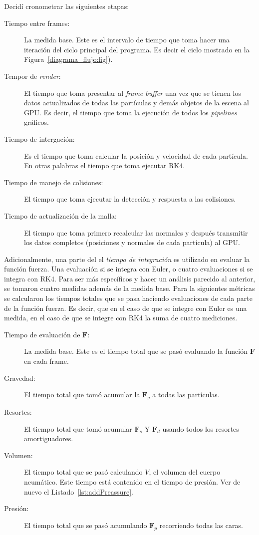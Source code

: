 Decidí cronometrar las siguientes etapas:
\begin{description}
 \item[Tiempo entre frames:] La medida base. Este es el intervalo  de tiempo que toma hacer una iteración del ciclo principal del programa. Es decir el ciclo mostrado en la Figura~\ref{diagrama_flujo:fig}).
 \item[Tempor de \emph{\textenglish{render}}:] El tiempo que toma presentar al \emph{\textenglish{frame buffer}} una vez que se tienen los datos actualizados de todas las partículas y demás objetos de la escena al GPU. Es decir, el tiempo que toma la ejecución de todos los \emph{\textenglish{pipelines}} gráficos.
 \item[Tiempo de intergación:] Es el tiempo que toma calcular la posición y velocidad de cada partícula. En otras palabras el tiempo que toma ejecutar RK4.
 \item[Tiempo de manejo de colisiones:] El tiempo que toma ejecutar la detección y respuesta a las colisiones.
 \item[Tiempo de actualización de la malla:] El tiempo que toma primero recalcular las normales y después transmitir los datos completos (posiciones y normales de cada partícula) al GPU.
\end{description}

Adicionalmente, una parte del el \emph{tiempo de integración} es utilizado en evaluar la función fuerza.
Una evaluación si se integra con Euler, o cuatro evaluaciones si se integra con RK4.
Para ser más específicos y hacer un análisis parecido al anterior, se tomaron cuatro medidas además de la medida base.
Para la siguientes métricas se calcularon los tiempos totales que se pasa haciendo evaluaciones de cada parte de la función fuerza.
Es decir, que en el caso de que se integre con Euler es una medida, en el caso de que se integre con RK4 la suma de cuatro mediciones.

\begin{description}
 \item[Tiempo de evaluación de $\textbf{F}$:] La medida base. Este es el tiempo total que se pasó evaluando la función $\textbf{F}$ en cada frame.
 \item[Gravedad:] El tiempo total que tomó acumular la $\textbf{F}_g$ a todas las partículas.
 \item[Resortes:] El tiempo total que tomó acumular $\textbf{F}_s$ Y $\textbf{F}_d$ usando todos los resortes amortiguadores.
 \item[Volumen:] El tiempo total que se pasó calculando $V$, el volumen del cuerpo neumático. Este tiempo está contenido en el tiempo de presión. Ver de nuevo el Listado~\ref{lst:addPreassure}.
 \item[Presión:] El tiempo total que se pasó acumulando $\textbf{F}_p$ recorriendo todas las caras.
\end{description}

